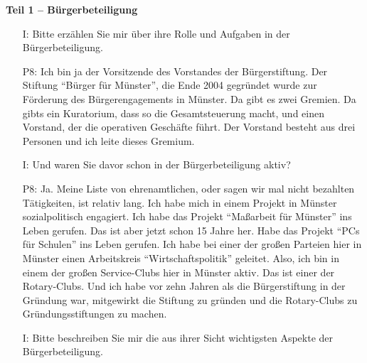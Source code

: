 \textbf{Teil 1 -- B{\"u}rgerbeteiligung}
\begin{itemize}
    \item[I:] Bitte erz{\"a}hlen Sie mir {\"u}ber ihre Rolle und Aufgaben in der B{\"u}rgerbeteiligung.
    \item[P8:] Ich bin ja der Vorsitzende des Vorstandes der B{\"u}rgerstiftung. Der Stiftung "`B{\"u}rger f{\"u}r M{\"u}nster"', die Ende 2004 gegr{\"u}ndet wurde zur F{\"o}rderung des B{\"u}rgerengagements in M{\"u}nster. Da gibt es zwei Gremien. Da gibts ein Kuratorium, dass so die Gesamtsteuerung macht, und einen Vorstand, der die operativen Gesch{\"a}fte f{\"u}hrt. Der Vorstand besteht aus drei Personen und ich leite dieses Gremium.
    \item[I:] Und waren Sie davor schon in der B{\"u}rgerbeteiligung aktiv?
    \item[P8:] Ja. Meine Liste von ehrenamtlichen, oder sagen wir mal nicht bezahlten T{\"a}tigkeiten, ist relativ lang. Ich habe mich in einem Projekt in M{\"u}nster sozialpolitisch engagiert. Ich habe das Projekt "`Ma{\ss}arbeit f{\"u}r M{\"u}nster"' ins Leben gerufen. Das ist aber jetzt schon 15 Jahre her. Habe das Projekt "`PCs f{\"u}r Schulen"' ins Leben gerufen. Ich habe bei einer der gro{\ss}en Parteien hier in M{\"u}nster einen Arbeitskreis "`Wirtschaftspolitik"' geleitet. Also, ich bin in einem der gro{\ss}en Service-Clubs hier in M{\"u}nster aktiv. Das ist einer der Rotary-Clubs. Und ich habe vor zehn Jahren als die B{\"u}rgerstiftung in der Gr{\"u}ndung war, mitgewirkt die Stiftung zu gr{\"u}nden und die Rotary-Clubs zu Gr{\"u}ndungsstiftungen zu machen.
    \item[I:] Bitte beschreiben Sie mir die aus ihrer Sicht wichtigsten Aspekte der B{\"u}rgerbeteiligung.

\end{itemize}
